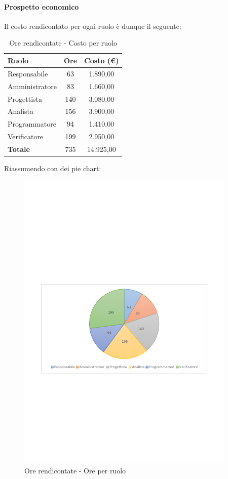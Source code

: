 \documentclass[../PianoProgetto.tex]{subfiles}
\begin{document}
\vfill
	
	\paragraph{Prospetto economico}
					Il costo rendicontato per ogni ruolo è dunque il seguente:
	\begin{table}[h]
		\centering
		\begin{tabular}{l * {2}{c}}
			\toprule
			\textbf{Ruolo} & \textbf{Ore} & \textbf{Costo (\euro{})} \\
			\midrule
			Responsabile &	63 & 1.890,00 \\
			Amministratore & 83 & 1.660,00 \\
			Progettista & 140 & 3.080,00 \\
			Analista & 156 & 3.900,00 \\
			Programmatore & 94 & 1.410,00 \\
			Verificatore & 199 & 2.950,00 \\
			\midrule		
			\textbf{Totale} & 735 & 14.925,00 \\
			\bottomrule
		\end{tabular}
		\caption{Ore rendicontate - Costo per ruolo}
		\label{tab:rendicontate_costo}
	\end{table}
\vfill
\newpage
\vfill	
	Riassumendo con dei pie chart:
	\begin{figure}[!h]
		\centering
		\includegraphics[width=0.93\textwidth , trim=2cm 9.5cm 2cm 11cm]{grafici/Riepilogo/Rendicontate/ore-ruolo}
			\caption{Ore rendicontate - Ore per ruolo}
		\label{fig:CircleChart-rendicontate_ore_r}
	\end{figure}
\end{document}
